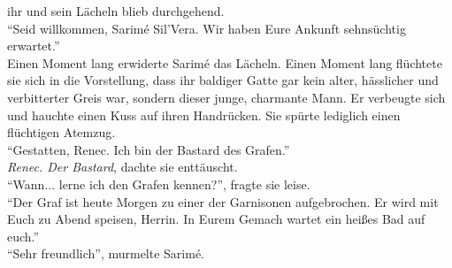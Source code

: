 ihr und sein Lächeln blieb durchgehend.\\
``Seid willkommen, Sarimé Sil'Vera. Wir haben Eure Ankunft sehnsüchtig erwartet.''\\
Einen Moment lang erwiderte Sarimé das Lächeln. Einen Moment lang flüchtete sie sich in die 
Vorstellung, dass ihr baldiger Gatte gar kein alter, hässlicher und verbitterter Greis war, sondern 
dieser junge, charmante Mann. Er verbeugte sich und hauchte einen Kuss auf ihren Handrücken. Sie 
spürte lediglich einen flüchtigen Atemzug.\\
``Gestatten, Renec. Ich bin der Bastard des Grafen.''\\
\textit{Renec. Der Bastard}, dachte sie enttäuscht. \\ 
``Wann... lerne ich den Grafen kennen?'', fragte sie leise.\\
``Der Graf ist heute Morgen zu einer der Garnisonen aufgebrochen. Er wird mit Euch zu Abend 
speisen, Herrin. In Eurem Gemach wartet ein heißes Bad auf euch.''\\
``Sehr freundlich'', murmelte Sarimé.\\
 
